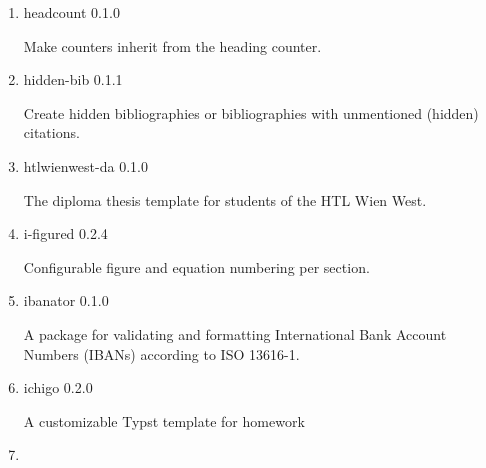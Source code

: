 \begin{enumerate}

  { haw-hamburg-report } { 0.3.1 }

  Unofficial template for writing a report in the HAW Hamburg department
  of Computer Science design.
\item
  \href{/universe/package/headcount/}{}

  { headcount } { 0.1.0 }

  Make counters inherit from the heading counter.
\item
  \href{/universe/package/hidden-bib/}{}

  { hidden-bib } { 0.1.1 }

  Create hidden bibliographies or bibliographies with unmentioned
  (hidden) citations.
\item
  \href{/universe/package/htlwienwest-da/}{}


  { htlwienwest-da } { 0.1.0 }

  The diploma thesis template for students of the HTL Wien West.

  { }
\item
  \href{/universe/package/i-figured/}{}

  { i-figured } { 0.2.4 }

  Configurable figure and equation numbering per section.
\item
  \href{/universe/package/ibanator/}{}

  { ibanator } { 0.1.0 }

  A package for validating and formatting International Bank Account
  Numbers (IBANs) according to ISO 13616-1.
\item
  \href{/universe/package/ichigo/}{}


  { ichigo } { 0.2.0 }

  A customizable Typst template for homework
\item
  \href{/universe/package/icicle/}{}



\end{enumerate}
